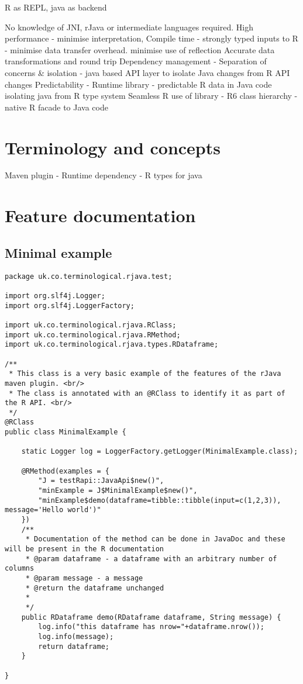 \documentclass[
]{jss}
\begin{document}
R as REPL, java as backend

No knowledge of JNI, rJava or intermediate languages required. High
performance - minimise interpretation, Compile time - strongly typed
inputs to R - minimise data transfer overhead. minimise use of
reflection Accurate data transformations and round trip Dependency
management - Separation of concerns \& isolation - java based API layer
to isolate Java changes from R API changes Predictability - Runtime
library - predictable R data in Java code isolating java from R type
system Seamless R use of library - R6 class hierarchy - native R facade
to Java code

\hypertarget{terminology-and-concepts}{%
\section{Terminology and concepts}\label{terminology-and-concepts}}

Maven plugin - Runtime dependency - R types for java

\hypertarget{feature-documentation}{%
\section{Feature documentation}\label{feature-documentation}}

\hypertarget{minimal-example}{%
\subsection{Minimal example}\label{minimal-example}}

\begin{verbatim}
package uk.co.terminological.rjava.test;

import org.slf4j.Logger;
import org.slf4j.LoggerFactory;

import uk.co.terminological.rjava.RClass;
import uk.co.terminological.rjava.RMethod;
import uk.co.terminological.rjava.types.RDataframe;

/**
 * This class is a very basic example of the features of the rJava maven plugin. <br/>
 * The class is annotated with an @RClass to identify it as part of the R API. <br/>
 */
@RClass
public class MinimalExample {

    static Logger log = LoggerFactory.getLogger(MinimalExample.class);
    
    @RMethod(examples = {
        "J = testRapi::JavaApi$new()",
        "minExample = J$MinimalExample$new()",
        "minExample$demo(dataframe=tibble::tibble(input=c(1,2,3)), message='Hello world')"
    })
    /**
     * Documentation of the method can be done in JavaDoc and these will be present in the R documentation 
     * @param dataframe - a dataframe with an arbitrary number of columns
     * @param message - a message
     * @return the dataframe unchanged
     *  
     */
    public RDataframe demo(RDataframe dataframe, String message) {
        log.info("this dataframe has nrow="+dataframe.nrow());
        log.info(message);
        return dataframe;
    }
    
}
\end{verbatim}
\end{document}
